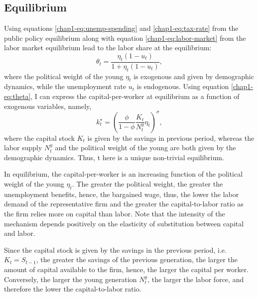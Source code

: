\subsection{Equilibrium}\label{chap1-equilibrium}

Using equations \eqref{chap1-eq:unemp-spending} and \eqref{chap1-eq:tax-rate} from the public policy equilibrium along with equation \eqref{chap1-eq:labor-market} from the labor market equilibrium lead to the labor share at the equilibrium:
\begin{equation}\label{chap1-eq:equilibrium-theta}
    \theta_t = \frac{\eta_t(1-u_t)}{1+\eta_t(1-u_t)},
\end{equation}
where the political weight of the young $\eta_t$ is exogenous and given by demographic dynamics, while the unemployment rate $u_t$ is endogenous.
Using equation \eqref{chap1-eq:theta}, I can express the capital-per-worker at equilibrium as a function of exogenous variables, namely, 
\begin{equation}\label{chap1-eq:equilibrium-k}
    k_t^\star = \left(\frac{\phi}{1-\phi}\frac{K_t}{N_t^y}\eta_t\right)^\sigma,
\end{equation}
where the capital stock $K_t$ is given by the savings in previous period, whereas the labor supply $N_t^y$ and the political weight of the young are both given by the demographic dynamics. Thus, t here is a unique non-trivial equilibrium.

In equilibrium, the capital-per-worker is an increasing function of the political weight of the young $\eta_t$. The greater the political weight, the greater the unemployment benefits, hence, the bargained wage, thus, the lower the labor demand of the representative firm and the greater the capital-to-labor ratio as the firm relies more on capital than labor. Note that the intensity of the mechanism depends positively on the elasticity of substitution between capital and labor.

Since the capital stock is given by the savings in the previous period, i.e. $K_t = S_{t-1}$, the greater the savings of the previous generation, the larger the amount of capital available to the firm, hence, the larger the capital per worker. Conversely, the larger the young generation $N_t^y$, the larger the labor force, and therefore the lower the capital-to-labor ratio.
